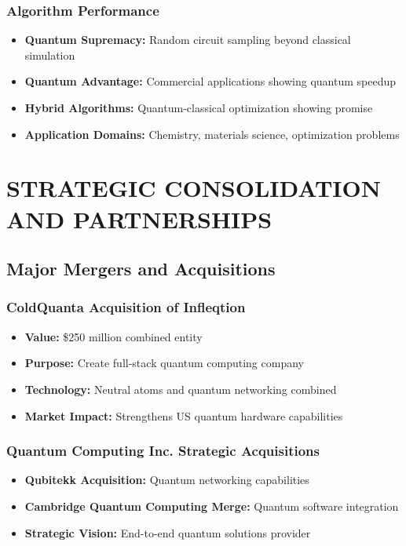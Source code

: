 \documentclass[12pt,a4paper]{article}
\begin{document}
\subsubsection{Algorithm Performance}
\begin{itemize}
    \item \textbf{Quantum Supremacy:} Random circuit sampling beyond classical simulation
    \item \textbf{Quantum Advantage:} Commercial applications showing quantum speedup
    \item \textbf{Hybrid Algorithms:} Quantum-classical optimization showing promise
    \item \textbf{Application Domains:} Chemistry, materials science, optimization problems
\end{itemize}

\section{STRATEGIC CONSOLIDATION AND PARTNERSHIPS}

\subsection{Major Mergers and Acquisitions}

\subsubsection{ColdQuanta Acquisition of Infleqtion}
\begin{itemize}
    \item \textbf{Value:} \$250 million combined entity
    \item \textbf{Purpose:} Create full-stack quantum computing company
    \item \textbf{Technology:} Neutral atoms and quantum networking combined
    \item \textbf{Market Impact:} Strengthens US quantum hardware capabilities
\end{itemize}

\subsubsection{Quantum Computing Inc. Strategic Acquisitions}
\begin{itemize}
    \item \textbf{Qubitekk Acquisition:} Quantum networking capabilities
    \item \textbf{Cambridge Quantum Computing Merge:} Quantum software integration
    \item \textbf{Strategic Vision:} End-to-end quantum solutions provider
\end{itemize}
\end{document}
